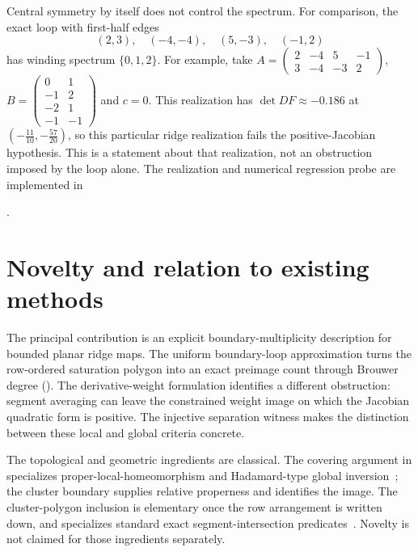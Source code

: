 \documentclass[11pt,twoside,leqno]{article}
\theoremstyle{plain}
\theoremstyle{definition}
\theoremstyle{remark}
\begin{document}
Central symmetry by itself does not control the spectrum.  For comparison, the exact loop with first-half edges
\[
 (2,3),\quad(-4,-4),\quad(5,-3),\quad(-1,2)
\]
has winding spectrum $\{0,1,2\}$.  For example, take
$A=\left(\begin{smallmatrix}2&-4&5&-1\\3&-4&-3&2\end{smallmatrix}\right)$,
$B=\left(\begin{smallmatrix}0&1\\-1&2\\-2&1\\-1&-1\end{smallmatrix}\right)$
and $c=0$. This realization has $\det DF\approx-0.186$ at $(-\tfrac{11}{10},-\tfrac{57}{20})$, so this particular ridge realization fails the positive-Jacobian hypothesis. This is a statement about that realization, not an obstruction imposed by the loop alone.  The realization and numerical regression probe are implemented in
\begin{center}
\small{}.
\end{center}

\section{Novelty and relation to existing methods}\label{sec:novelty}

The principal contribution is an explicit boundary-multiplicity description for bounded planar ridge maps. The uniform boundary-loop approximation turns the row-ordered saturation polygon into an exact preimage count through Brouwer degree (). The derivative-weight formulation identifies a different obstruction: segment averaging can leave the constrained weight image on which the Jacobian quadratic form is positive. The injective separation witness makes the distinction between these local and global criteria concrete.

The topological and geometric ingredients are classical. The covering argument in  specializes proper-local-homeomorphism and Hadamard-type global inversion~\cite{gutu-jaramillo,ruzhansky-sugimoto}; the cluster boundary supplies relative properness and identifies the image. The cluster-polygon inclusion is elementary once the row arrangement is written down, and  specializes standard exact segment-intersection predicates~\cite{deberg}. Novelty is not claimed for those ingredients separately.
\end{document}

